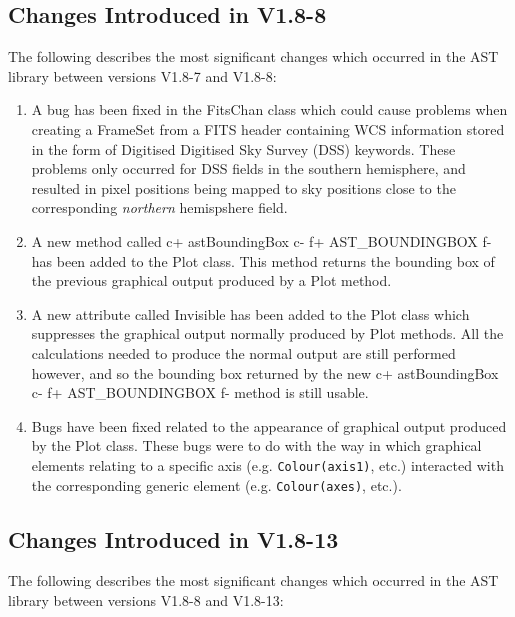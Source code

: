 \documentclass[twoside,11pt]{article}
\begin{document}
\subsection{Changes Introduced in V1.8-8}

The following describes the most significant changes which
occurred in the AST library between versions V1.8-7 and V1.8-8:

\begin{enumerate}

\item A bug has been fixed in the FitsChan class which could cause
problems when creating a FrameSet from a FITS header containing WCS
information stored in the form of Digitised Digitised Sky Survey (DSS) 
keywords. These problems only occurred for DSS fields in the southern
hemisphere, and resulted in pixel positions being mapped to sky positions
close to the corresponding {\em northern} hemispshere field.

\item A new method called 
c+
astBoundingBox
c-
f+
AST\_BOUNDINGBOX
f-
has been added to the Plot class. This method returns the bounding box of
the previous graphical output produced by a Plot method.

\item A new attribute called Invisible has been added to the Plot class
which suppresses the graphical output normally produced by Plot methods.
All the calculations needed to produce the normal output are still
performed however, and so the bounding box returned by the new 
c+
astBoundingBox
c-
f+
AST\_BOUNDINGBOX
f-
method is still usable.

\item Bugs have been fixed related to the appearance of graphical output 
produced by the Plot class. These bugs were to do with the way in which 
graphical elements relating to a specific axis (e.g. {\tt Colour(axis1)}, etc.) 
interacted with the corresponding generic element (e.g. 
{\tt Colour(axes)}, etc.).

\end{enumerate}


\subsection{Changes Introduced in V1.8-13}

The following describes the most significant changes which occurred
in the AST library between versions V1.8-8 and V1.8-13:
\end{document}
